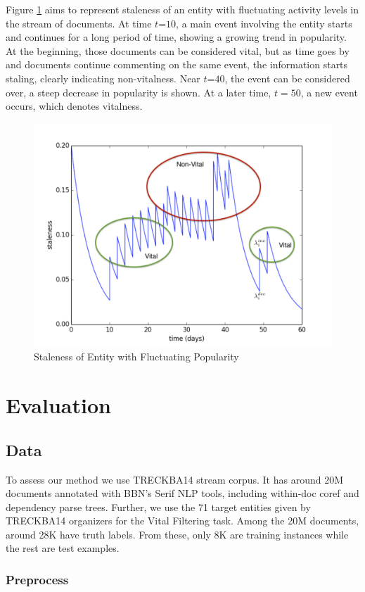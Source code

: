 \documentclass{article}
\begin{document}
Figure \ref{stalenessmedium} aims to represent staleness of an entity with fluctuating activity levels in the stream of documents. At time $t\mathord{=}10$, a main event involving the entity starts and continues for a long period of time, showing a growing trend in popularity. 
At the beginning, those documents can be considered vital, but as time goes by and documents continue commenting on the same event, the information starts staling, clearly indicating non-vitalness.
Near $t\mathord{=}40$, the event can be considered over, a steep decrease in popularity is shown. At a later time, $t=50$, a new event occurs, which denotes vitalness.

\begin{figure}[h!]
\centering
\includegraphics[width=.5\textwidth]{staleness2.pdf}
\caption{Staleness of Entity with Fluctuating Popularity}
\label{stalenessmedium}
\end{figure}


\section{Evaluation}
\label{evaluation}

\subsection{Data}
\label{data}

To assess our method we use TRECKBA14 stream corpus. It has around 20M documents annotated with BBN's Serif NLP tools, including within-doc coref and dependency parse trees. Further, we use the 71 target entities given by TRECKBA14 organizers for the Vital Filtering task. Among the 20M documents, around 28K have truth labels. From these, only 8K are training instances while the rest are test examples.

\subsubsection{Preprocess}
\end{document}
